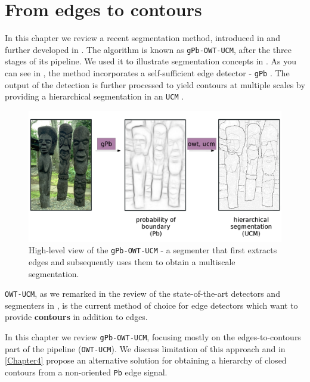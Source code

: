 \chapter{From edges to contours} %
\label{Chapter3}

In this chapter we review a recent segmentation method, introduced in \cite{Arbelaez09} and further developed %
in \cite{Arbelaez11}. The algorithm is known as {\tt gPb-OWT-UCM}, after the three stages of its pipeline. We used it to illustrate segmentation concepts in . As you can see in , the method incorporates a self-sufficient edge detector - {\tt gPb} \cite{Maire2008using}. The output of the detection is further processed to yield contours at multiple scales by %
providing a hierarchical segmentation in an {\tt UCM} \cite{Arbelaez2006boundary}.

\begin{figure}[ht!]
\centering
 \includegraphics[width=1\textwidth]{images/gPb-OWT-UCM/gPb-OWT-UCM-high-level.png}
\caption[High-level view of the {\tt gPb-OWT-UCM} algorithm]{High-level view of the {\tt gPb-OWT-UCM} - a segmenter that first extracts edges and subsequently uses them to obtain a multiscale segmentation.}
\label{fig:gPb-OWT-UCM-high-level}
\end{figure}

{\tt OWT-UCM}, as we remarked in the review of the state-of-the-art detectors and segmenters in , is the current method of choice for edge detectors which want to provide {\bf %
contours} in addition to edges.

In this chapter we review {\tt gPb-OWT-UCM}, focusing mostly on the edges-to-contours part of the pipeline ({\tt OWT-UCM}). We discuss limitation of this approach and in \cref{Chapter4} propose an alternative solution for obtaining a hierarchy of closed contours from a non-oriented {\tt Pb} edge signal.

